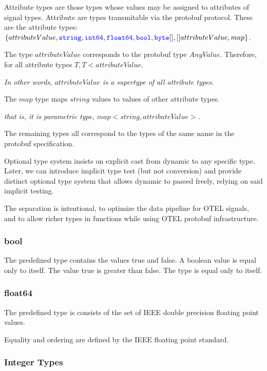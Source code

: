 \documentclass{article}
\begin{document}
{Attribute types are those types whose values may be assigned to attributes of signal types. 
Attribute are types transmitable via the protobuf protocol.
These are the attribute types: $\{attributeValue, \texttt{\color{blue} string}, \texttt{\color{blue} int64}, \texttt{\color{blue} float64}, \texttt{\color{blue} bool}, \texttt{\color{blue} byte}[], []attributeValue,  map\}$.

The type $attributeValue$ corresponds to the protobuf type $AnyValue$. Therefore, for all attribute types $T, T < attributeValue$.

{\em In other words, $attributeValue$  is a supertype of all attribute types.}

The $map$ type maps $string$ values to values of other attribute types.

{\em that is, it is parametric type, $map<string, attributeValue>$.}

 The remaining types all correspond to the types of the same name in the protobuf specification.


Optional type system insists on explicit cast from dynamic to any specific type.
Later, we can introduce implicit type test (but not conversion) and provide distinct optional type system that allows dynamic to passed freely, relying on said implicit testing.

The separation is intentional, to optimize the data pipeline for OTEL signals, and to allow richer types in functions while using OTEL protobuf infrastructure.

 
\subsubsection{bool}
\label{bool}

The predefined type \BOOL{} contains the values true and false.  A boolean value is equal only to itself. The value true is greater than false. The type \BOOL{} is equal only to itself.

 
 \subsubsection{float64}
 \label{f64}
 
 The predefined type \FSIXTYFOUR{} is consists of the set of IEEE double precision floating point values.
 
 Equality and ordering are defined by the IEEE floating point standard.

 \subsubsection{Integer Types}
 \label{integerTypes}
 
}
\end{document}
